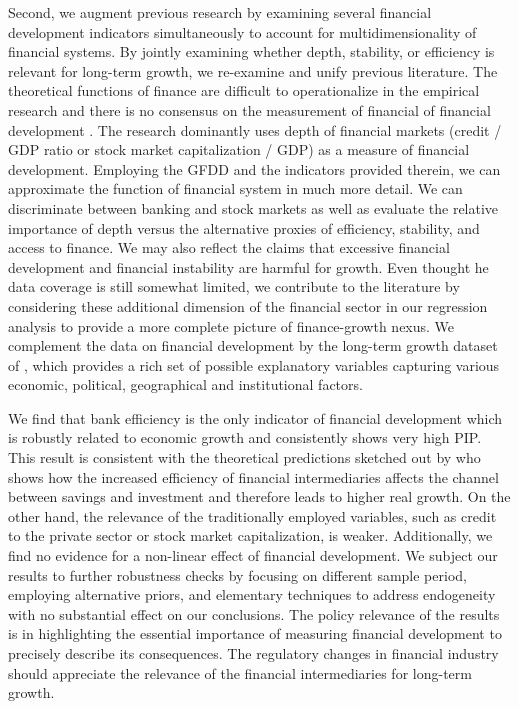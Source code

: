\begin{refsection}
Second, we augment previous research by examining several financial development indicators simultaneously to account for multidimensionality of financial systems. By jointly examining whether depth, stability, or efficiency is relevant for long-term growth, we re-examine and unify previous literature. The theoretical functions of finance are difficult to operationalize in the empirical research \parencite{Valickovaetal2014} and there is no consensus on the measurement of financial of financial development \parencite{KingLevine1993a}. The research dominantly uses depth of financial markets (credit / GDP ratio or stock market capitalization / GDP) as a measure of financial development. Employing the \ac{GFDD} and the indicators provided therein, we can approximate the function of financial system in much more detail. We can discriminate between banking and stock markets as well as evaluate the relative importance of depth versus the alternative proxies of efficiency, stability, and access to finance. We may also reflect the claims that excessive financial development and financial instability are harmful for growth. Even thought he data coverage is still somewhat limited, we contribute to the literature by considering these additional dimension of the financial sector in our regression analysis to provide a more complete picture of finance-growth nexus. We complement the data on financial development by the long-term growth dataset of \textcite{Fernandezetal2001}, which provides a rich set of possible explanatory variables capturing various economic, political, geographical and institutional factors.

We find that bank efficiency is the only indicator of financial development which is robustly related to economic growth and consistently shows very high \ac{PIP}. This result is consistent with the theoretical predictions sketched out by \textcite{Pagano1993} who shows how the increased efficiency of financial intermediaries affects the channel between savings and investment and therefore leads to higher real growth. On the other hand, the relevance of the traditionally employed variables, such as credit to the private sector or stock market capitalization, is weaker. Additionally, we find no evidence for a non-linear effect of financial development. We subject our results to further robustness checks by focusing on different sample period, employing alternative priors, and elementary techniques to address endogeneity with no substantial effect on our conclusions. The policy relevance of the results is in highlighting the essential importance of measuring financial development to precisely describe its consequences. The regulatory changes in financial industry should appreciate the relevance of the financial intermediaries for long-term growth.


\end{refsection}
